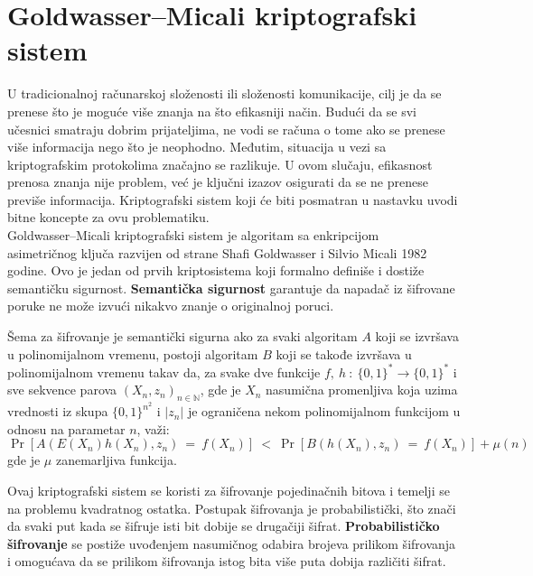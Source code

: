 \section{\textenglish{Goldwasser–Micali} kriptografski sistem}
U tradicionalnoj računarskoj složenosti ili složenosti komunikacije, cilj je da se prenese što je moguće više znanja na što efikasniji način. Budući da se svi učesnici smatraju dobrim prijateljima, ne vodi se računa o tome ako se prenese više informacija nego što je neophodno. Međutim, situacija u vezi sa kriptografskim protokolima značajno se razlikuje. U ovom slučaju, efikasnost prenosa znanja nije problem, već je ključni izazov osigurati da se ne prenese previše informacija. Kriptografski sistem koji će biti posmatran u nastavku uvodi bitne koncepte za ovu problematiku\cite{quadResCrpt}.\\

\textenglish{Goldwasser–Micali} kriptografski sistem je algoritam sa enkripcijom\\ asimetričnog ključa razvijen od strane  \textenglish{Shafi Goldwasser i Silvio Micali} 1982 godine. Ovo je jedan od prvih kriptosistema koji formalno definiše i dostiže semantičku sigurnost. \textbf{Semantička sigurnost} garantuje da napadač iz šifrovane poruke ne može izvući nikakvo znanje o originalnoj poruci\cite{CRPTsytGM10.1145/800070.802212}.

 \begin{definition}
 	Šema za šifrovanje je semantički sigurna ako za svaki algoritam $A$ koji se izvršava u polinomijalnom vremenu, postoji algoritam $B$ koji se takođe izvršava u polinomijalnom vremenu takav da, za svake dve funkcije $f,\ h\ :\ \{0,1\}^{*} \rightarrow \{0,1\}^{*}$ i sve sekvence parova $(X_{n},z_{n})_{n \in \mathbb{N}}$, gde je $X_{n}$ nasumična promenljiva koja uzima vrednosti iz skupa $\{0,1\}^{n^{2}}$ i $|z_{n}|$ je ograničena nekom polinomijalnom funkcijom u odnosu na parametar $n$, važi:
 	$$\Pr[A(E(X_{n})h(X_{n}),z_{n})\ =\ f(X_{n})]\ < \ \Pr[B(h(X_{n}),z_{n})\ =\ f(X_{n})] + \mu(n)$$
 	gde je $\mu$ zanemarljiva funkcija.
 \end{definition}
 
Ovaj kriptografski sistem se koristi za šifrovanje pojedinačnih bitova i  temelji se na problemu kvadratnog ostatka. Postupak šifrovanja je probabilistički, što znači da svaki put kada se šifruje isti bit dobije se drugačiji šifrat. {\bf Probabilističko šifrovanje} se postiže uvođenjem nasumičnog odabira brojeva prilikom šifrovanja i omogućava da se prilikom šifrovanja istog bita više puta dobija različiti šifrat\cite{CRYPTOgoldreich2001foundations}\cite{GOLDWASSER1984270}.\\

